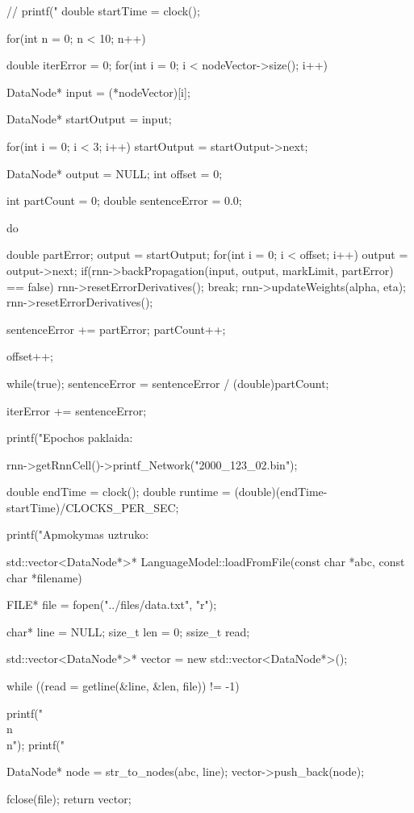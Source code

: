 {  // printf("%
  double startTime = clock();

  for(int n = 0; n < 10; n++){
    double iterError = 0;
    for(int i = 0; i < nodeVector->size(); i++){
      DataNode* input = (*nodeVector)[i];


      DataNode* startOutput = input;

      for(int i = 0; i < 3; i++)
        startOutput = startOutput->next;


      DataNode* output = NULL;
      int offset = 0;

      int partCount = 0;
      double sentenceError = 0.0;

      do{
        double partError;
        output = startOutput;
        for(int i = 0; i < offset; i++)
          output = output->next;
        if(rnn->backPropagation(input, output, markLimit, partError) == false){
          rnn->resetErrorDerivatives();
          break;
        }
        rnn->updateWeights(alpha, eta);
        rnn->resetErrorDerivatives();

        sentenceError += partError;
        partCount++;


        offset++;
      }while(true);
      sentenceError = sentenceError / (double)partCount;

      iterError += sentenceError;
    }

     printf("Epochos paklaida: %
  }

  rnn->getRnnCell()->printf\_Network("2000\_123\_02.bin");



  double endTime = clock();
  double runtime = (double)(endTime-startTime)/CLOCKS\_PER\_SEC;

  printf("Apmokymas uztruko: %


}

std::vector<DataNode*>* LanguageModel::loadFromFile(const char *abc, const char *filename){
  FILE* file = fopen("../files/data.txt", "r");

  char* line = NULL;
  size\_t len = 0;
  ssize\_t read;

  std::vector<DataNode*>* vector = new std::vector<DataNode*>();

  while ((read = getline(\&line, \&len, file)) != -1) {
    printf("\\n\\n");
    printf("%

    DataNode* node = str\_to\_nodes(abc, line);
    vector->push\_back(node);


  }

  fclose(file);
  return vector;
}

